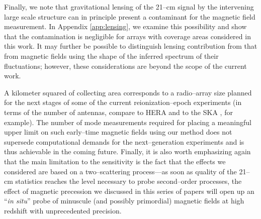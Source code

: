 Finally, we note that gravitational lensing of the 21--cm signal by the intervening large scale structure can in principle present a contaminant for the magnetic field measurement. In Appendix \ref{app:lensing}, we examine this possibility and show that the contamination is negligible for arrays with coverage areas considered in this work. It may further be possible to distinguish lensing contribution from that from magnetic fields using the shape of the inferred spectrum of their fluctuations; however, these considerations are beyond the scope of the current work.

A kilometer squared of collecting area corresponds to a radio--array size planned for the next stages of some of the current reionization--epoch experiments (in terms of the number of antennas, compare to HERA and to the SKA \cite{2008arXiv0802.1727C}, for example). The number of mode measurements required for placing a meaningful upper limit on such early--time magnetic fields using our method does not supersede computational demands for the next--generation  experiments and is thus achievable in the coming future. Finally, it is also worth emphasizing again that the main limitation to the sensitivity is the fact that the effects we considered are based on a two--scattering process---as soon as quality of the 21--cm statistics reaches the level necessary to probe second--order processes, the effect of magnetic precession we discussed in this series of papers will open up an ``\textit{in situ}'' probe of minuscule (and possibly primordial) magnetic fields at high redshift with unprecedented precision. 

  